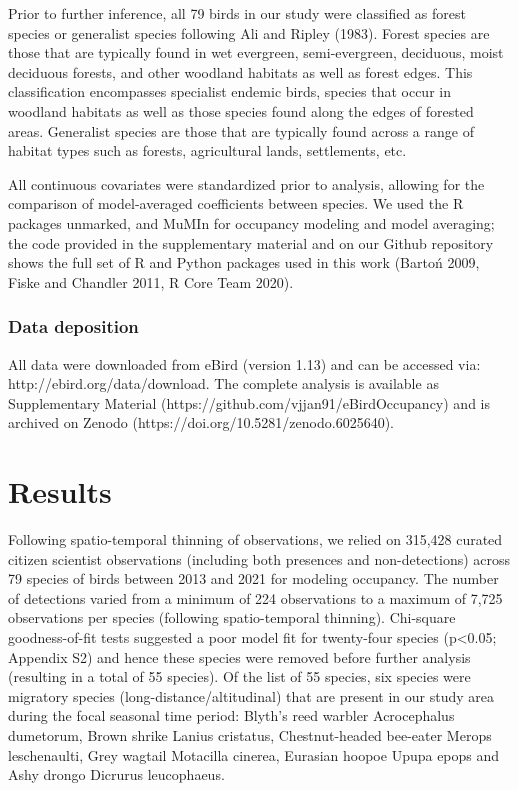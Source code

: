 Prior to further inference, all 79 birds in our study were classified as forest species or generalist species following Ali and Ripley (1983).
Forest species are those that are typically found in wet evergreen, semi-evergreen, deciduous, moist deciduous forests, and other woodland habitats as well as forest edges.
This classification encompasses specialist endemic birds, species that occur in woodland habitats as well as those species found along the edges of forested areas.
Generalist species are those that are typically found across a range of habitat types such as forests, agricultural lands, settlements, etc.

All continuous covariates were standardized prior to analysis, allowing for the comparison of model-averaged coefficients between species.
We used the R packages unmarked, and MuMIn for occupancy modeling and model averaging; the code provided in the supplementary material and on our Github repository shows the full set of R and Python packages used in this work (Bartoń 2009, Fiske and Chandler 2011, R Core Team 2020).

\subsubsection*{Data deposition}

All data were downloaded from eBird (version 1.13) and can be accessed via: http://ebird.org/data/download.
The complete analysis is available as Supplementary Material (https://github.com/vjjan91/eBirdOccupancy) and is archived on Zenodo (https://doi.org/10.5281/zenodo.6025640).

\section*{Results}

Following spatio-temporal thinning of observations, we relied on 315,428 curated citizen scientist observations (including both presences and non-detections) across 79 species of birds between 2013 and 2021 for modeling occupancy.
The number of detections varied from a minimum of 224 observations to a maximum of 7,725 observations per species (following spatio-temporal thinning).
Chi-square goodness-of-fit tests suggested a poor model fit for twenty-four species (p<0.05; Appendix S2) and hence these species were removed before further analysis (resulting in a total of 55 species).
Of the list of 55 species, six species were migratory species (long-distance/altitudinal) that are present in our study area during the focal seasonal time period: Blyth's reed warbler Acrocephalus dumetorum, Brown shrike Lanius cristatus, Chestnut-headed bee-eater Merops leschenaulti, Grey wagtail Motacilla cinerea, Eurasian hoopoe Upupa epops and Ashy drongo Dicrurus leucophaeus.

